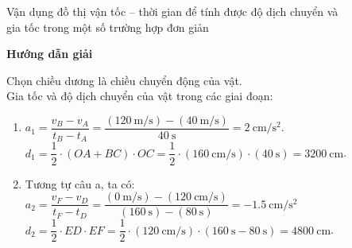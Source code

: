 \begin{dang}{Vận dụng đồ thị vận tốc – thời gian để tính được độ dịch chuyển và\\gia tốc trong một số trường hợp đơn giản}
	{	\begin{center}
			\textbf{Hướng dẫn giải}
		\end{center}
	Chọn chiều dương là chiều chuyển động của vật.\\
	Gia tốc và độ dịch chuyển của vật trong các giai đoạn:
	\begin{enumerate}[label=\alph*)]
		\item $a_1=\dfrac{v_B-v_A}{t_B-t_A}=\dfrac{\left(\SI{120}{\meter/\second}\right)-\left(\SI{40}{\meter/\second}\right)}{\SI{40}{\second}}=\SI{2}{\centi\meter/\second^2}$.\\
		$d_1=\dfrac{1}{2}\cdot\left(OA+BC\right)\cdot OC=\dfrac{1}{2}\cdot\left(\SI{160}{\centi\meter/\second}\right)\cdot \left(\SI{40}{\second}\right)=\SI{3200}{\centi\meter}$.
		\item Tương tự câu a, ta có:
		$a_2 =\dfrac{v_F-v_D}{t_F - t_D}=\dfrac{\left(\SI{0}{\meter/\second}\right)-\left(\SI{120}{\centi\meter/\second}\right)}{\left(\SI{160}{\second}\right)-\left(\SI{80}{\second}\right)}=\SI{-1.5}{\centi\meter/\second^2}$\\
		$d_2=\dfrac{1}{2}\cdot ED \cdot EF=\dfrac{1}{2}\cdot\left(\SI{120}{\centi\meter/\second}\right)\cdot\left(\SI{160}{\second}-\SI{80}{\second}\right)=\SI{4800}{\centi\meter}$.
	\end{enumerate}
	}
\end{dang}

